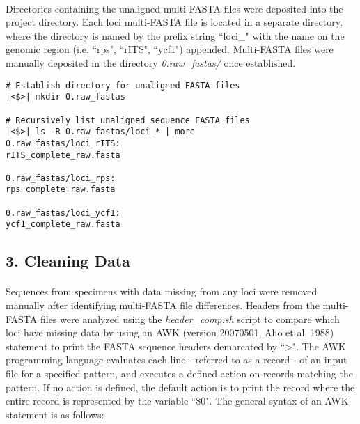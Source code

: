 \paragraph{} Directories containing the unaligned multi-FASTA files were deposited into the project directory.  Each loci multi-FASTA file is located in a separate directory, where the directory is named by the prefix string ``loci\_" with the name on the genomic region (i.e. ``rps", ``rITS", ``ycf1") appended.  Multi-FASTA files were manually deposited in the directory \textit{0.raw\_fastas/} once established.

\clearpage

\begin{lstlisting}[caption={Unaligned sequence data deposited in \textit{0.raw\_fastas/} subdirectory}]
# Establish directory for unaligned FASTA files 
|<$>| mkdir 0.raw_fastas

# Recursively list unaligned sequence FASTA files
|<$>| ls -R 0.raw_fastas/loci_* | more
0.raw_fastas/loci_rITS:
rITS_complete_raw.fasta

0.raw_fastas/loci_rps:
rps_complete_raw.fasta

0.raw_fastas/loci_ycf1:
ycf1_complete_raw.fasta
\end{lstlisting}

\vspace*{30pt}

\subsection*{3. Cleaning Data}

\paragraph{} Sequences from specimens with data missing from any loci were removed manually after identifying multi-FASTA file differences.  Headers from the multi-FASTA files were analyzed using the \textit{header\_comp.sh} script to compare which loci have missing data by using an AWK (version 20070501, Aho et al. 1988) statement to print the FASTA sequence headers demarcated by ``>".  The AWK programming language evaluates each line - referred to as a record - of an input file for a specified pattern, and executes a defined action on records matching the pattern.  If no action is defined, the default action is to print the record where the entire record is represented by the variable ``\$0".  The general syntax of an AWK statement is as follows:  

